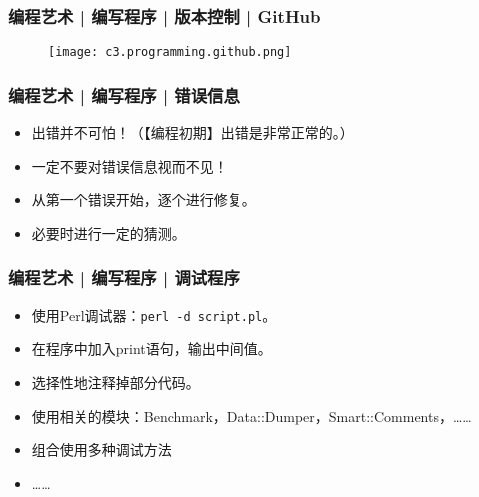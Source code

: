 \begin{frame}
  \frametitle{编程艺术 | 编写程序 | 版本控制 | GitHub}
  \begin{figure}
    \centering
    \texttt{[image: c3.programming.github.png]}
  \end{figure}
\end{frame}

\begin{frame}
  \frametitle{编程艺术 | 编写程序 | 错误信息}
  \begin{itemize}
    \item 出错并不可怕！（【编程初期】出错是非常正常的。）
    \item 一定不要对错误信息视而不见！
    \item 从第一个错误开始，逐个进行修复。
    \item 必要时进行一定的猜测。
  \end{itemize}
\end{frame}

\begin{frame}[fragile]
  \frametitle{编程艺术 | 编写程序 | \alert{调试程序}}
  \begin{itemize}
    \item 使用Perl调试器：\verb|perl -d script.pl|。
    \item 在程序中加入print语句，输出中间值。
    \item 选择性地注释掉部分代码。
    \item 使用相关的模块：Benchmark，Data::Dumper，Smart::Comments，……
    \item 组合使用多种调试方法
    \item ……
  \end{itemize}
\end{frame}

